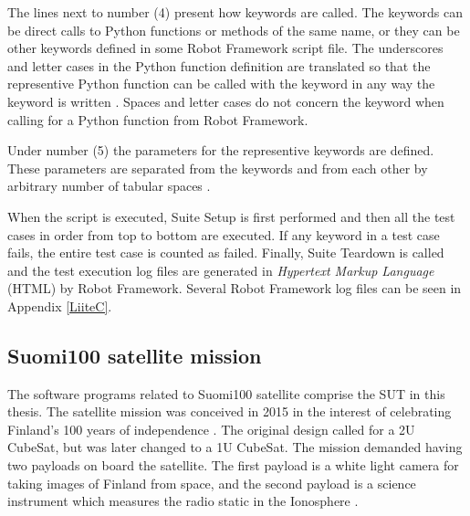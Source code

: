 \documentclass[english,12pt,a4paper,pdftex,elec,utf8]{aaltothesis}
\begin{document}
The lines next to number (4) present how keywords are called. The keywords can be direct calls to Python functions or methods of the same name, or they can be other keywords defined in some Robot Framework script file. The underscores and letter cases in the Python function definition are translated so that the representive Python function can be called with the keyword in any way the keyword is written \cite{robotuserguide}. Spaces and letter cases do not concern the keyword when calling for a Python function from Robot Framework.\par 
Under number (5) the parameters for the representive keywords are defined. These parameters are separated from the keywords and from each other by arbitrary number of tabular spaces \cite{robotuserguide}.\par
When the script is executed, Suite Setup is first performed and then all the test cases in order from top to bottom are executed. If any keyword in a test case fails, the entire test case is counted as failed. Finally, Suite Teardown is called and the test execution log files are generated in \textit{Hypertext Markup Language} (HTML) by Robot Framework. Several Robot Framework log files can be seen in Appendix \ref{LiiteC}. \cite{robotuserguide}
\subsection{Suomi100 satellite mission}
The software programs related to Suomi100 satellite comprise the SUT in this thesis. The satellite mission was conceived in 2015 in the interest of celebrating Finland's 100 years of independence \cite{s1002015}. The original design called for a 2U CubeSat, but was later changed to a 1U CubeSat. The mission demanded having two payloads on board the satellite. The first payload is a white light camera for taking images of Finland from space, and the second payload is a science instrument which measures the radio static in the Ionosphere \cite{s100blogi, s1002015}.\par
\end{document}
